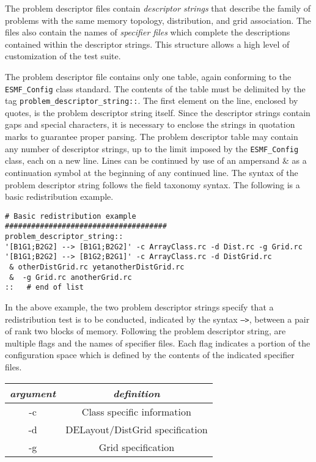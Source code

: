 The problem descriptor files contain \textit{descriptor strings} that describe the family of problems with the same memory topology, distribution, and grid association. The files also contain the names of \textit{specifier files} which complete the descriptions contained within the descriptor strings. This structure allows a high level of customization of the test suite.

The problem descriptor file contains only one table, again conforming to the \texttt{ESMF\_Config} class standard. The contents of the table must be delimited by the tag \texttt{problem\_descriptor\_string::}. The first element on the line, enclosed by quotes, is the problem descriptor string itself. Since the descriptor strings contain gaps and special characters, it is necessary to enclose the strings in quotation marks to guarantee proper parsing. The problem descriptor table may contain any number of descriptor strings, up to the limit imposed by the \texttt{ESMF\_Config} class, each on a new line. Lines can be continued by use of an ampersand {\&} as a continuation symbol at the beginning of any continued line. The syntax of the problem descriptor string follows the field taxonomy syntax. The following is a basic redistribution example.
\begin{verbatim}
# Basic redistribution example
#####################################
problem_descriptor_string::
'[B1G1;B2G2] --> [B1G1;B2G2]' -c ArrayClass.rc -d Dist.rc -g Grid.rc 
'[B1G1;B2G2] --> [B1G2;B2G1]' -c ArrayClass.rc -d DistGrid.rc 
 & otherDistGrid.rc yetanotherDistGrid.rc
 &  -g Grid.rc anotherGrid.rc  
::   # end of list
\end{verbatim}
In the above example, the two problem descriptor strings specify that a redistribution test is to be conducted, indicated by the syntax  \texttt{-->}, between a pair of rank two blocks of memory. Following the problem descriptor string, are multiple flags and the names of specifier files. Each flag indicates a portion of the configuration space which is defined by the contents of the indicated specifier files.  
\begin{center}
\begin{tabular}{| c | c |} \hline
{\em argument } & {\em definition} \\
\hline \hline
-c &  Class specific information \\
-d & DELayout/DistGrid specification \\
-g & Grid specification \\
\hline 
\end{tabular}
\end{center}
